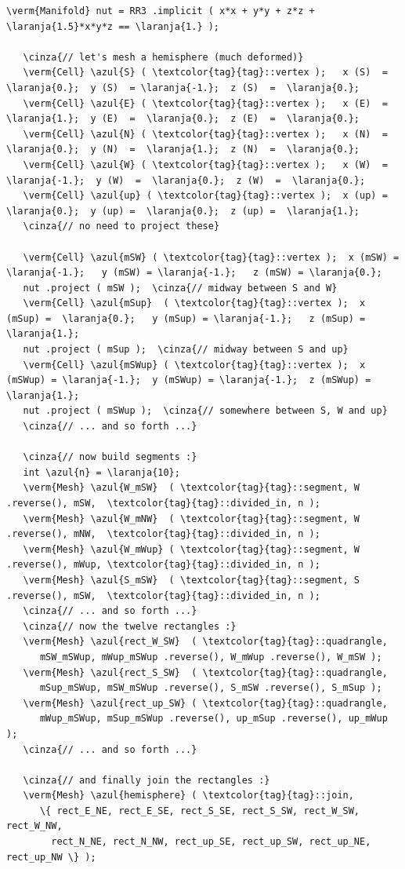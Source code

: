 \begin{Verbatim}[commandchars=\\\{\},formatcom=\small\tt,frame=single,
   label=parag-\ref{\numb section 2.\numb parag 7}.cpp,rulecolor=\color{coment},
   baselinestretch=0.94,framesep=2mm]
   \verm{Manifold} nut = RR3 .implicit ( x*x + y*y + z*z + \laranja{1.5}*x*y*z == \laranja{1.} );

   \cinza{// let's mesh a hemisphere (much deformed)}
   \verm{Cell} \azul{S} ( \textcolor{tag}{tag}::vertex );   x (S)  =  \laranja{0.};  y (S)  = \laranja{-1.};  z (S)  =  \laranja{0.};
   \verm{Cell} \azul{E} ( \textcolor{tag}{tag}::vertex );   x (E)  =  \laranja{1.};  y (E)  =  \laranja{0.};  z (E)  =  \laranja{0.};
   \verm{Cell} \azul{N} ( \textcolor{tag}{tag}::vertex );   x (N)  =  \laranja{0.};  y (N)  =  \laranja{1.};  z (N)  =  \laranja{0.};
   \verm{Cell} \azul{W} ( \textcolor{tag}{tag}::vertex );   x (W)  = \laranja{-1.};  y (W)  =  \laranja{0.};  z (W)  =  \laranja{0.};
   \verm{Cell} \azul{up} ( \textcolor{tag}{tag}::vertex );  x (up) =  \laranja{0.};  y (up) =  \laranja{0.};  z (up) =  \laranja{1.};
   \cinza{// no need to project these}

   \verm{Cell} \azul{mSW} ( \textcolor{tag}{tag}::vertex );  x (mSW) = \laranja{-1.};   y (mSW) = \laranja{-1.};   z (mSW) = \laranja{0.};
   nut .project ( mSW );  \cinza{// midway between S and W}
   \verm{Cell} \azul{mSup}  ( \textcolor{tag}{tag}::vertex );  x (mSup) =  \laranja{0.};   y (mSup) = \laranja{-1.};   z (mSup) = \laranja{1.};
   nut .project ( mSup );  \cinza{// midway between S and up}
   \verm{Cell} \azul{mSWup} ( \textcolor{tag}{tag}::vertex );  x (mSWup) = \laranja{-1.};  y (mSWup) = \laranja{-1.};  z (mSWup) = \laranja{1.};
   nut .project ( mSWup );  \cinza{// somewhere between S, W and up}
   \cinza{// ... and so forth ...}

   \cinza{// now build segments :}
   int \azul{n} = \laranja{10};
   \verm{Mesh} \azul{W_mSW}  ( \textcolor{tag}{tag}::segment, W .reverse(), mSW,  \textcolor{tag}{tag}::divided_in, n );
   \verm{Mesh} \azul{W_mNW}  ( \textcolor{tag}{tag}::segment, W .reverse(), mNW,  \textcolor{tag}{tag}::divided_in, n );
   \verm{Mesh} \azul{W_mWup} ( \textcolor{tag}{tag}::segment, W .reverse(), mWup, \textcolor{tag}{tag}::divided_in, n );
   \verm{Mesh} \azul{S_mSW}  ( \textcolor{tag}{tag}::segment, S .reverse(), mSW,  \textcolor{tag}{tag}::divided_in, n );
   \cinza{// ... and so forth ...}
   \cinza{// now the twelve rectangles :}
   \verm{Mesh} \azul{rect_W_SW}  ( \textcolor{tag}{tag}::quadrangle,
      mSW_mSWup, mWup_mSWup .reverse(), W_mWup .reverse(), W_mSW );
   \verm{Mesh} \azul{rect_S_SW}  ( \textcolor{tag}{tag}::quadrangle,
      mSup_mSWup, mSW_mSWup .reverse(), S_mSW .reverse(), S_mSup );
   \verm{Mesh} \azul{rect_up_SW} ( \textcolor{tag}{tag}::quadrangle,
      mWup_mSWup, mSup_mSWup .reverse(), up_mSup .reverse(), up_mWup );
   \cinza{// ... and so forth ...}

   \cinza{// and finally join the rectangles :}
   \verm{Mesh} \azul{hemisphere} ( \textcolor{tag}{tag}::join,
      \{ rect_E_NE, rect_E_SE, rect_S_SE, rect_S_SW, rect_W_SW, rect_W_NW,
        rect_N_NE, rect_N_NW, rect_up_SE, rect_up_SW, rect_up_NE, rect_up_NW \} );
\end{Verbatim}

